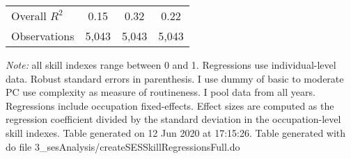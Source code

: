 \begin{center}
\begin{threeparttable}[!h]
\begin{tabular}{lccc}
\midrule Overall $ R^2$&        0.15         &        0.32         &        0.22         \\
Observations        &       5,043         &       5,043         &       5,043         \\
\bottomrule
\bottomrule
\end{tabular}
\begin{tablenotes}
\item \tiny \textit{Note:} all skill indexes range between 0 and 1. Regressions use individual-level data. Robust standard errors in parenthesis. I use dummy of basic to moderate PC use complexity as measure of routineness. I pool data from all years. Regressions include occupation fixed-effects. Effect sizes are computed as the regression coefficient divided by the standard deviation in the occupation-level skill indexes. Table generated on 12 Jun 2020 at 17:15:26. Table generated with do file 3\_sesAnalysis/createSESSkillRegressionsFull.do
\end{tablenotes}
\end{threeparttable}
\end{center}
